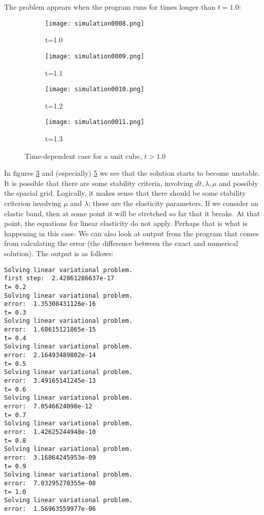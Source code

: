 \documentclass[twoside]{article}
\begin{document}
The problem appears when the program runs for times longer than $t=1.0$:

\begin{figure}[h!]
        \centering
        \begin{subfigure}[b]{0.3\textwidth}
                \centering
                \texttt{[image: simulation0008.png]}
                \caption{t=1.0}
                \label{t:1.0}
        \end{subfigure}  
        \quad
        \begin{subfigure}[b]{0.3\textwidth}
                \centering
                \texttt{[image: simulation0009.png]}
                \caption{t=1.1}
                \label{t:1.1}
        \end{subfigure}        
     
        \begin{subfigure}[b]{0.3\textwidth}
                \centering
                \texttt{[image: simulation0010.png]}
                \caption{t=1.2}
                \label{t:1.2}
        \end{subfigure}  
        \quad
        \begin{subfigure}[b]{0.3\textwidth}
                \centering
                \texttt{[image: simulation0011.png]}
                \caption{t=1.3}
                \label{t:1.3}
        \end{subfigure}   
        \caption{Time-dependent case for a unit cube, $t > 1.0$}     
\end{figure}

In figures \ref{t:1.2} and (especially) \ref{t:1.3} we see that the solution starts to become unstable. It is possible that there are some stability criteria, involving $dt, \lambda, \mu$ and possibly the spacial grid. Logically, it makes sense that there should be some stability criterion involving $\mu$ and $\lambda$; these are the elasticity parameters. If we consider an elastic band, then at some point it will be stretched so far that it breaks. At that point, the equations for linear elasticity do not apply. Perhaps that is what is happening in this case.
We can also look at output from the program that comes from calculating the error (the difference between the exact and numerical solution). The output is as follows:

\begin{verbatim}
Solving linear variational problem.
first step:  2.42861286637e-17
t= 0.2
Solving linear variational problem.
error:  1.35308431126e-16
t= 0.3
Solving linear variational problem.
error:  1.68615121865e-15
t= 0.4
Solving linear variational problem.
error:  2.16493489802e-14
t= 0.5
Solving linear variational problem.
error:  3.49165141245e-13
t= 0.6
Solving linear variational problem.
error:  7.0546624098e-12
t= 0.7
Solving linear variational problem.
error:  1.42625244948e-10
t= 0.8
Solving linear variational problem.
error:  3.16864245953e-09
t= 0.9
Solving linear variational problem.
error:  7.03295270355e-08
t= 1.0
Solving linear variational problem.
error:  1.56963559977e-06
\end{verbatim}
\end{document}
